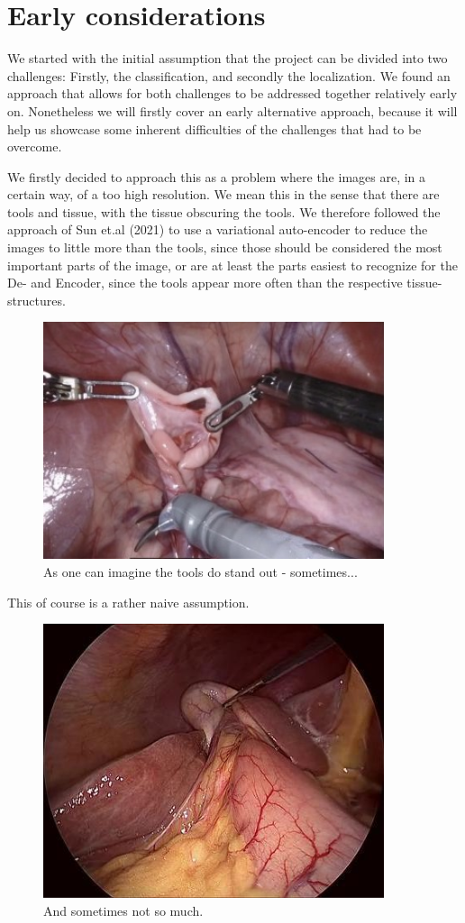 \section{Early considerations}

We started with the initial assumption that the project can be divided into two challenges: Firstly, the classification, and secondly the localization. We found an approach that allows for both challenges to be addressed together relatively early on. Nonetheless we will firstly cover an early alternative approach, because it will help us showcase some inherent difficulties of the challenges that had to be overcome.

We firstly decided to approach this as a problem where the images are, in a certain way, of a too high resolution. We mean this in the sense that there are tools and tissue, with the tissue obscuring the tools. We therefore followed the approach of Sun et.al (2021) to use a variational auto-encoder to reduce the images to little more than the tools, since those should be considered the most important parts of the image, or are at least the parts easiest to recognize for the De- and Encoder, since the tools appear more often than the respective tissue-structures.

\begin{figure}
	\centering
	\includegraphics[width=10cm]{3_methodology/Tools}
	\caption{As one can imagine the tools do stand out - sometimes...}
	\label{fig:Tools_Good}
\end{figure}
This of course is a rather naive assumption.
\begin{figure}
	\centering
	\includegraphics[width=10cm]{3_methodology/tools_bad}
	\caption{And sometimes not so much.}
	\label{fig:Tools_Bad}
\end{figure}



